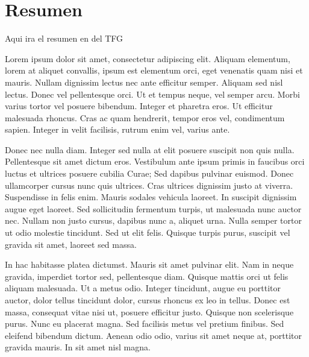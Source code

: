 

\chapter*{Resumen}

Aqui ira el resumen en del TFG





Lorem ipsum dolor sit amet, consectetur adipiscing elit. Aliquam elementum, lorem at aliquet convallis, ipsum est elementum orci, eget venenatis quam nisi et mauris. Nullam dignissim lectus nec ante efficitur semper. Aliquam sed nisl lectus. Donec vel pellentesque orci. Ut et tempus neque, vel semper arcu. Morbi varius tortor vel posuere bibendum. Integer et pharetra eros. Ut efficitur malesuada rhoncus. Cras ac quam hendrerit, tempor eros vel, condimentum sapien. Integer in velit facilisis, rutrum enim vel, varius ante.

Donec nec nulla diam. Integer sed nulla at elit posuere suscipit non quis nulla. Pellentesque sit amet dictum eros. Vestibulum ante ipsum primis in faucibus orci luctus et ultrices posuere cubilia Curae; Sed dapibus pulvinar euismod. Donec ullamcorper cursus nunc quis ultrices. Cras ultrices dignissim justo at viverra. Suspendisse in felis enim. Mauris sodales vehicula laoreet. In suscipit dignissim augue eget laoreet. Sed sollicitudin fermentum turpis, ut malesuada nunc auctor nec. Nullam non justo cursus, dapibus nunc a, aliquet urna. Nulla semper tortor ut odio molestie tincidunt. Sed ut elit felis. Quisque turpis purus, suscipit vel gravida sit amet, laoreet sed massa.

In hac habitasse platea dictumst. Mauris sit amet pulvinar elit. Nam in neque gravida, imperdiet tortor sed, pellentesque diam. Quisque mattis orci ut felis aliquam malesuada. Ut a metus odio. Integer tincidunt, augue eu porttitor auctor, dolor tellus tincidunt dolor, cursus rhoncus ex leo in tellus. Donec est massa, consequat vitae nisi ut, posuere efficitur justo. Quisque non scelerisque purus. Nunc eu placerat magna. Sed facilisis metus vel pretium finibus. Sed eleifend bibendum dictum. Aenean odio odio, varius sit amet neque at, porttitor gravida mauris. In sit amet nisl magna.

